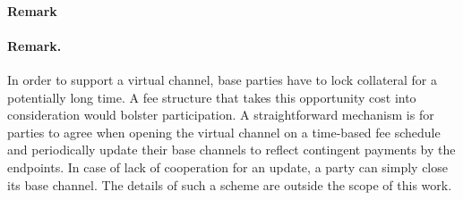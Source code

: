 \makeatletter%
%
  {\paragraph{Remark}}%
  {\paragraph{Remark.}}%
\makeatother%
   In order to support a virtual channel, base parties have
  to lock collateral for a potentially long time. A fee structure that takes
  this opportunity cost into consideration would bolster participation. A
  straightforward mechanism is for parties to agree when opening the virtual
  channel on a time-based fee schedule and periodically update their base
  channels to reflect contingent payments by the endpoints. In case of lack of
  cooperation for an update, a party can simply close its base channel. The
  details of such a scheme are outside the scope of this work.
